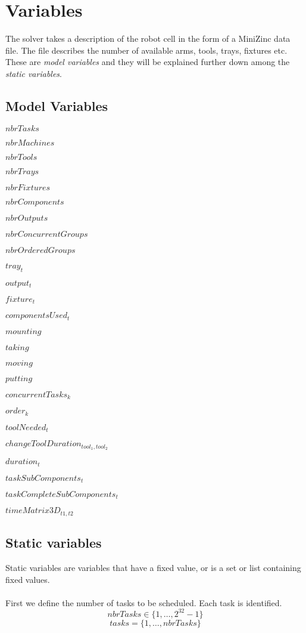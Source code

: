  \section{Variables}
 The solver takes a description of the robot cell in the form of a MiniZinc data file. The file describes the number of available arms, tools, trays, fixtures etc. These are \emph{model variables} and they will be explained further down among the \emph{static variables}.
 
 \subsection{Model Variables}
\begin{itemize*}
\item $nbrTasks$
\item $nbrMachines$
\item $nbrTools$
\item $nbrTrays$
\item $nbrFixtures$
\item $nbrComponents$
\item $nbrOutputs$
\item $nbrConcurrentGroups$
\item $nbrOrderedGroups$
\item $tray_t$
\item $output_t$
\item $fixture_t$
\item $componentsUsed_t$
\item $mounting$
\item $taking$
\item $moving$
\item $putting$
\item $concurrentTasks_k$
\item $order_k$
\item $toolNeeded_t$
\item $changeToolDuration_{tool_1,tool_2}$
\item $duration_t$
\item $taskSubComponents_t$
\item $taskCompleteSubComponents_t$
\item $timeMatrix3D_{t1,t2}$
\end{itemize*}
 
 \subsection{Static variables}
 Static variables are variables that have a fixed value, or is a set or list containing fixed values.
 \\\\
  First we define the number of tasks to be scheduled. Each task is identified.
 \begin{equation}\label{eq:1}
 nbrTasks \in \{1 , \ldots , 2^{32}-1\}
 \end{equation}
 \begin{equation}\label{eq:10}
 tasks = \{1 , \ldots , nbrTasks\}
 \end{equation}

